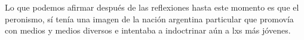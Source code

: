 \documentclass[
10pt, %
a4paper, %
oneside, %
headinclude,footinclude, %
]{scrartcl}
\begin{document}
Lo que podemos afirmar después de las reflexiones hasta este momento es que el peronismo, sí tenía una imagen de la nación argentina particular que promovía con medios y medios diversos e intentaba a indoctrinar aún a lxs más jóvenes.


\renewcommand{\refname}{\spacedlowsmallcaps{Referencias}} %

\nocite{*}
%
%
%

\printbibliography
\end{document}
